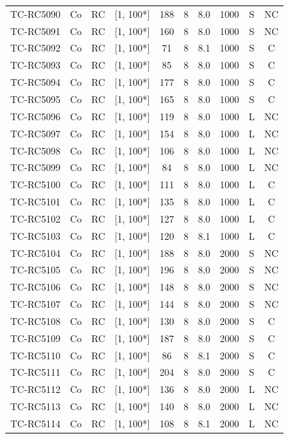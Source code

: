 \begin{longtable}{lccccccccc}
TC-RC5090 & Co & RC & [1, 100*] & 188 & 8 & 8.0 & 1000 & S & NC \\
TC-RC5091 & Co & RC & [1, 100*] & 160 & 8 & 8.0 & 1000 & S & NC \\
TC-RC5092 & Co & RC & [1, 100*] & 71 & 8 & 8.1 & 1000 & S & C \\
TC-RC5093 & Co & RC & [1, 100*] & 85 & 8 & 8.0 & 1000 & S & C \\
TC-RC5094 & Co & RC & [1, 100*] & 177 & 8 & 8.0 & 1000 & S & C \\
TC-RC5095 & Co & RC & [1, 100*] & 165 & 8 & 8.0 & 1000 & S & C \\
TC-RC5096 & Co & RC & [1, 100*] & 119 & 8 & 8.0 & 1000 & L & NC \\
TC-RC5097 & Co & RC & [1, 100*] & 154 & 8 & 8.0 & 1000 & L & NC \\
TC-RC5098 & Co & RC & [1, 100*] & 106 & 8 & 8.0 & 1000 & L & NC \\
TC-RC5099 & Co & RC & [1, 100*] & 84 & 8 & 8.0 & 1000 & L & NC \\
TC-RC5100 & Co & RC & [1, 100*] & 111 & 8 & 8.0 & 1000 & L & C \\
TC-RC5101 & Co & RC & [1, 100*] & 135 & 8 & 8.0 & 1000 & L & C \\
TC-RC5102 & Co & RC & [1, 100*] & 127 & 8 & 8.0 & 1000 & L & C \\
TC-RC5103 & Co & RC & [1, 100*] & 120 & 8 & 8.1 & 1000 & L & C \\
TC-RC5104 & Co & RC & [1, 100*] & 188 & 8 & 8.0 & 2000 & S & NC \\
TC-RC5105 & Co & RC & [1, 100*] & 196 & 8 & 8.0 & 2000 & S & NC \\
TC-RC5106 & Co & RC & [1, 100*] & 148 & 8 & 8.0 & 2000 & S & NC \\
TC-RC5107 & Co & RC & [1, 100*] & 144 & 8 & 8.0 & 2000 & S & NC \\
TC-RC5108 & Co & RC & [1, 100*] & 130 & 8 & 8.0 & 2000 & S & C \\
TC-RC5109 & Co & RC & [1, 100*] & 187 & 8 & 8.0 & 2000 & S & C \\
TC-RC5110 & Co & RC & [1, 100*] & 86 & 8 & 8.1 & 2000 & S & C \\
TC-RC5111 & Co & RC & [1, 100*] & 204 & 8 & 8.0 & 2000 & S & C \\
TC-RC5112 & Co & RC & [1, 100*] & 136 & 8 & 8.0 & 2000 & L & NC \\
TC-RC5113 & Co & RC & [1, 100*] & 140 & 8 & 8.0 & 2000 & L & NC \\
TC-RC5114 & Co & RC & [1, 100*] & 108 & 8 & 8.1 & 2000 & L & NC \\

\end{longtable}
